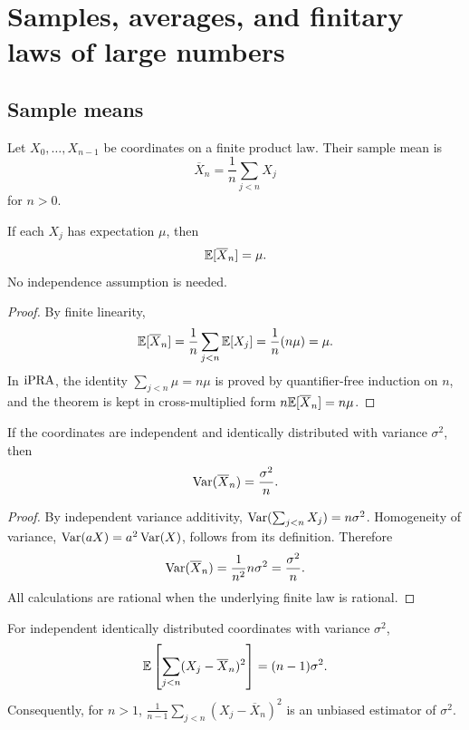 \section{Samples, averages, and finitary laws of large numbers}\label{sec:samples}

\subsection{Sample means}

Let \(X_0,\ldots,X_{n-1}\) be coordinates on a finite product law.  Their
sample mean is
\[
 \overline X_n=\frac1n\sum_{j<n}X_j
\]
for \(n>0\).

\begin{theorem}\label{thm:sample-mean}
If each \(X_j\) has expectation \(\mu\), then
\[
 \mathbb E[\overline X_n]=\mu.
\]
No independence assumption is needed.
\end{theorem}

\begin{proof}
By finite linearity,
\[
 \mathbb E[\overline X_n]
 =\frac1n\sum_{j<n}\mathbb E[X_j]
 =\frac1n(n\mu)=\mu.
\]
In \(\mathrm{iPRA}\), the identity \(\sum_{j<n}\mu=n\mu\) is proved by
quantifier-free induction on \(n\), and the theorem is kept in
cross-multiplied form \(n\mathbb E[\overline X_n]=n\mu\).
\end{proof}

\begin{theorem}\label{thm:sample-var}
If the coordinates are independent and identically distributed with variance
\(\sigma^2\), then
\[
 \operatorname{Var}(\overline X_n)=\frac{\sigma^2}{n}.
\]
\end{theorem}

\begin{proof}
By independent variance additivity,
\(\operatorname{Var}(\sum_{j<n}X_j)=n\sigma^2\).  Homogeneity of variance,
\(\operatorname{Var}(aX)=a^2\operatorname{Var}(X)\), follows from its definition.  Therefore
\[
 \operatorname{Var}(\overline X_n)=\frac1{n^2}n\sigma^2=\frac{\sigma^2}{n}.
\]
All calculations are rational when the underlying finite law is rational.
\end{proof}

\begin{theorem}\label{thm:residual}
For independent identically distributed coordinates with variance
\(\sigma^2\),
\[
 \mathbb E\left[\sum_{j<n}(X_j-\overline X_n)^2\right]=(n-1)\sigma^2.
\]
Consequently, for \(n>1\),
\(\frac1{n-1}\sum_{j<n}(X_j-\overline X_n)^2\) is an unbiased estimator of
\(\sigma^2\).
\end{theorem}

